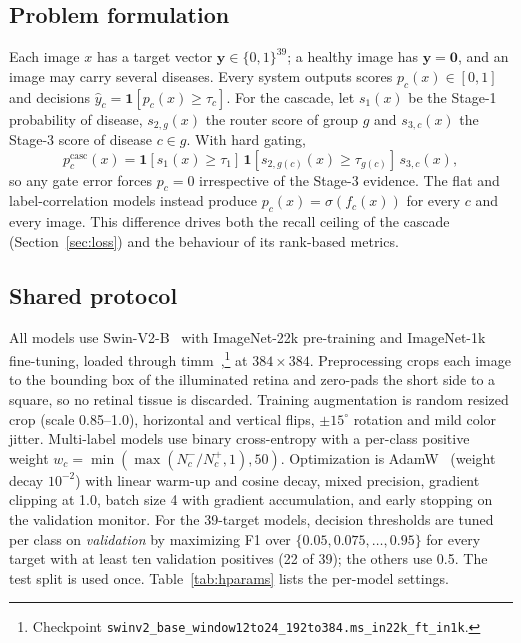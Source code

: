 \documentclass[conference]{IEEEtran}
\begin{document}
\subsection{Problem formulation}
Each image $x$ has a target vector $\mathbf{y}\in\{0,1\}^{39}$; a healthy image has
$\mathbf{y}=\mathbf{0}$, and an image may carry several diseases. Every system outputs
scores $p_c(x)\in[0,1]$ and decisions $\hat y_c=\mathbf{1}[p_c(x)\ge\tau_c]$. For the
cascade, let $s_1(x)$ be the Stage-1 probability of disease, $s_{2,g}(x)$ the router
score of group $g$ and $s_{3,c}(x)$ the Stage-3 score of disease $c\in g$. With hard
gating,
\begin{equation}
p^{\mathrm{casc}}_c(x)=\mathbf{1}\!\left[s_1(x)\ge\tau_1\right]\,
\mathbf{1}\!\left[s_{2,g(c)}(x)\ge\tau_{g(c)}\right]\, s_{3,c}(x),
\label{eq:cascade}
\end{equation}
so any gate error forces $p_c=0$ irrespective of the Stage-3 evidence. The flat and
label-correlation models instead produce $p_c(x)=\sigma(f_c(x))$ for every $c$ and
every image. This difference drives both the recall ceiling of the cascade
(Section~\ref{sec:loss}) and the behaviour of its rank-based metrics.

\subsection{Shared protocol}
All models use Swin-V2-B~\cite{liu2022swinv2} with ImageNet-22k pre-training and
ImageNet-1k fine-tuning, loaded through timm~\cite{timm},\footnote{Checkpoint
\texttt{swinv2\_base\_window12to24\_\allowbreak 192to384.\allowbreak ms\_in22k\_ft\_in1k}.} at $384\times384$. Preprocessing crops
each image to the bounding box of the illuminated retina and zero-pads the short side
to a square, so no retinal tissue is discarded. Training augmentation is random
resized crop (scale 0.85--1.0), horizontal and vertical flips, $\pm15^\circ$ rotation
and mild color jitter. Multi-label models use binary cross-entropy with a
per-class positive weight $w_c=\min(\max(N^-_c/N^+_c,1),50)$. Optimization is
AdamW~\cite{loshchilov2019} (weight decay $10^{-2}$) with linear warm-up and cosine
decay, mixed precision, gradient clipping at 1.0, batch size 4 with gradient
accumulation, and early stopping on the validation monitor. For the 39-target models, decision thresholds are
tuned per class on \emph{validation} by maximizing F1 over $\{0.05,0.075,\dots,0.95\}$
for every target with at least ten validation positives (22 of 39); the others use
0.5. The test split is used once. Table~\ref{tab:hparams} lists the per-model
settings.
\end{document}

